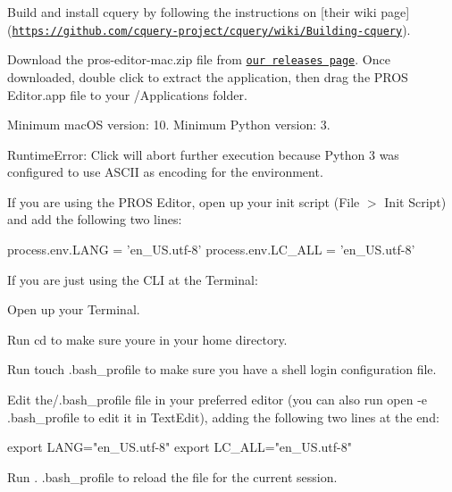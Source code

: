 \begin{DoxyEnumerate}
\item Build and install cquery by following the instructions on \mbox{[}their wiki page\mbox{]}(\href{https://github.com/cquery-project/cquery/wiki/Building-cquery}{\tt https\+://github.\+com/cquery-\/project/cquery/wiki/\+Building-\/cquery}).
\item Download the pros-\/editor-\/mac.\+zip file from \href{https://github.com/purduesigbots/atom/releases/latest}{\tt our releases page}. Once downloaded, double click to extract the application, then drag the P\+R\+OS Editor.\+app file to your /\+Applications folder.
\end{DoxyEnumerate}

Minimum mac\+OS version\+: 10. Minimum Python version\+: 3.

Runtime\+Error\+: Click will abort further execution because Python 3 was configured to use A\+S\+C\+II as encoding for the environment.

If you are using the P\+R\+OS Editor, open up your init script (File $>$ Init Script) and add the following two lines\+:


\begin{DoxyCode}
process.env.LANG = 'en\_US.utf-8'
process.env.LC\_ALL = 'en\_US.utf-8'
\end{DoxyCode}


If you are just using the C\+LI at the Terminal\+:


\begin{DoxyEnumerate}
\item Open up your Terminal.
\item Run cd to make sure you\textquotesingle{}re in your home directory.
\item Run touch .bash\+\_\+profile to make sure you have a shell login configuration file.
\item Edit the/.bash\+\_\+profile file in your preferred editor (you can also run open -\/e .bash\+\_\+profile to edit it in Text\+Edit), adding the following two lines at the end\+:
\end{DoxyEnumerate}


\begin{DoxyCode}
export LANG="en\_US.utf-8"
export LC\_ALL="en\_US.utf-8"
\end{DoxyCode}



\begin{DoxyEnumerate}
\item Run . .bash\+\_\+profile to reload the file for the current session.
\end{DoxyEnumerate}

